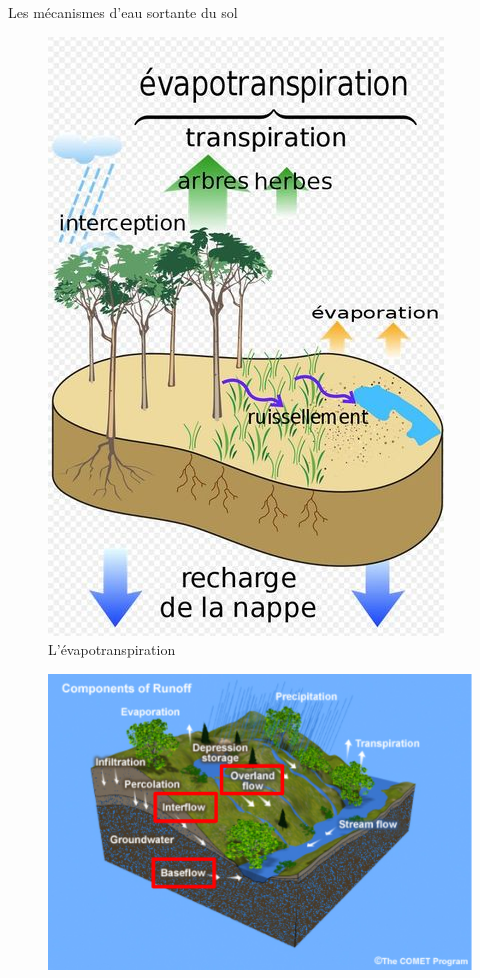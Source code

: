 \documentclass{beamer}
\numberwithin{equation}{section}
\begin{document}
	\begin{frame}{Les mécanismes d'eau sortante du sol}
		\begin{minipage}[b]{0.5\linewidth}
			\begin{figure}
				\begin{center}
					\includegraphics[scale=0.35]{images/evapotranspiration.jpg}
				\end{center}
			\caption{L'évapotranspiration}
			\end{figure} 
		\end{minipage}\hfill
		\begin{minipage}[b]{0.5\linewidth}
					\begin{figure}
						\begin{center}
							\includegraphics[scale=0.18]{different_flows.png}

\end{center}
\end{figure}
\end{minipage}
\end{frame}
\end{document}
